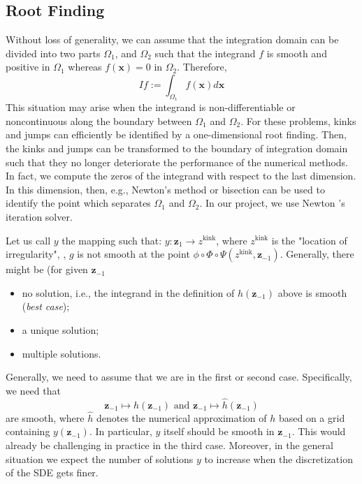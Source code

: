 \subsection{Root Finding}\label{sec: Root Finding}
Without loss of generality, we can assume that the integration domain  can
be divided into two parts $\Omega_1$, and $\Omega_2$ such that the integrand $f$ is smooth and positive in $\Omega_1$ whereas $f(\mathbf{x}) = 0$ in $\Omega_2$. Therefore,
\begin{equation}
I f := \int_{\Omega_1} f(\mathbf{x}) d \mathbf{x}
\end{equation}
This situation may arise when the integrand is non-differentiable or noncontinuous along the boundary between $\Omega_1$ and $\Omega_2$. For these problems, kinks and jumps can efficiently be identified by a one-dimensional root finding. Then, the kinks and jumps can
be transformed to the boundary of integration domain such that they no longer deteriorate the performance of the numerical methods. In fact, we  compute the zeros of the integrand  with respect to  the last dimension. In this dimension, then, e.g., Newton's method or bisection can be used to identify the point which separates $\Omega_1$ and $\Omega_2$. In our project, we use Newton 's iteration solver.

Let us call $y$ the mapping such that: $y: \mathbf{z}_1 \rightarrow z^{\text{kink}}$, where  $z^{\text{kink}}$ is   the "location of
irregularity", \ie,  $g$ is not smooth at the point $\phi \circ \Phi \circ \Psi(z^{\text{kink}}, \mathbf{z}_{-1})$. Generally, there might be (for given $\mathbf{z}_{-1}$
\begin{itemize}
	\item no solution, i.e., the integrand in the definition of $h(\mathbf{z}_{-1})$ above
	is smooth (\textit{best case});
	\item a unique solution;
	\item multiple solutions.
\end{itemize}

Generally, we need to assume that we are in the first or second
case. Specifically, we need that
\begin{equation*}
	\mathbf{z}_{-1} \mapsto h(\mathbf{z}_{-1}) \text{ and } \mathbf{z}_{-1} \mapsto \hat{h}(\mathbf{z}_{-1})
\end{equation*}
are smooth, where $\hat{h}$ denotes the numerical approximation of $h$ based
on a grid containing $y(\mathbf{z}_{-1})$. In particular, $y$ itself should be smooth
in $\mathbf{z}_{-1}$. This would already be challenging in practice in the third
case. Moreover, in the general situation we expect the number of solutions $y$ to increase when the discretization of the SDE gets finer.

